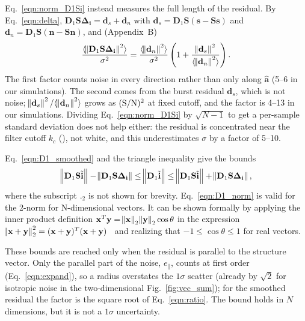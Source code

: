 \documentclass[twocolumn]{aastex631}
\begin{document}
Eq.~\eqref{eqn:norm_D1Si} instead measures the full length of the residual. By Eq.~\eqref{eqn:delta}, $\mathbf{D}_1\mathbf{S}\mathbf{\Delta_i}=\mathbf{d}_s+\mathbf{d}_n$ with $\mathbf{d}_s=\mathbf{D}_1\mathbf{S}(\mathbf{s}-\mathbf{S}\mathbf{s})$ and $\mathbf{d}_n=\mathbf{D}_1\mathbf{S}(\mathbf{n}-\mathbf{S}\mathbf{n})$, and (Appendix~B)
\begin{eqnarray}
\frac{\langle\norm{\mathbf{D}_1\mathbf{S}\mathbf{\Delta_i}}^2\rangle}{\sigma^2}=\frac{\langle\norm{\mathbf{d}_n}^2\rangle}{\sigma^2}\left(1+\frac{\norm{\mathbf{d}_s}^2}{\langle\norm{\mathbf{d}_n}^2\rangle}\right).
\label{eqn:ratio}
\end{eqnarray}
The first factor counts noise in every direction rather than only along $\hat{\mathbf{a}}$ (5--6 in our simulations). The second comes from the burst residual $\mathbf{d}_s$, which is not noise; $\norm{\mathbf{d}_s}^2/\langle\norm{\mathbf{d}_n}^2\rangle$ grows as $({\rm S/N})^2$ at fixed cutoff, and the factor is 4--13 in our simulations. Dividing Eq.~\eqref{eqn:norm_D1Si} by $\sqrt{N-1}$ to get a per-sample standard deviation does not help either: the residual is concentrated near the filter cutoff $k_c$ (), not white, and this underestimates $\sigma$ by a factor of 5--10.

Eq.~\eqref{eqn:D1_smoothed} and the triangle inequality give the bounds 
\begin{eqnarray}
\norm{\mathbf{D}_1\mathbf{S}\tilde{\mathbf{i}}}-\norm{\mathbf{D}_1\mathbf{S}\mathbf{\Delta_i}}\leq\norm{\mathbf{D}_1\tilde{\mathbf{i}}}\leq\norm{\mathbf{D}_1\mathbf{S}\tilde{\mathbf{i}}}+\norm{\mathbf{D}_1\mathbf{S}\mathbf{\Delta_i}},
\label{eqn:D1_norm}
\end{eqnarray}
where the subscript $._2$ is not shown for brevity. Eq.~\eqref{eqn:D1_norm} is valid for the 2-norm for N-dimensional vectors. It can be shown formally by applying the inner product definition $\mathbf{x}^T\mathbf{y}=\norm{\mathbf{x}}_2\norm{\mathbf{y}}_2  \cos\theta$ in the expression $\norm{\mathbf{x} + \mathbf{y}}_2^2=(\mathbf{x} + \mathbf{y})^T(\mathbf{x} + \mathbf{y})$~\citep[see Ch.~1]{Strang_LALD2019} and realizing that $-1\leq \cos\theta \leq 1$ for real vectors. 

These bounds are reached only when the residual is parallel to the structure vector. Only the parallel part of the noise, $e_\parallel$, counts at first order (Eq.~\ref{eqn:expand}), so a radius overstates the $1\sigma$ scatter (already by $\sqrt{2}$ for isotropic noise in the two-dimensional Fig.~\ref{fig:vec_sum}); for the smoothed residual the factor is the square root of Eq.~\eqref{eqn:ratio}. The bound holds in $N$ dimensions, but it is not a $1\sigma$ uncertainty.
\end{document}
